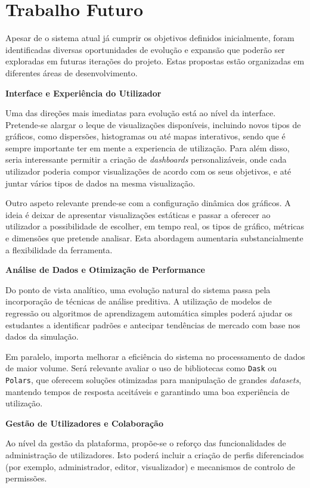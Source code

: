 \section{Trabalho Futuro}

Apesar de o sistema atual já cumprir os objetivos definidos inicialmente, foram identificadas diversas oportunidades de evolução e expansão que poderão ser exploradas em futuras iterações do projeto. Estas propostas estão organizadas em diferentes áreas de desenvolvimento.

\textbf{Interface e Experiência do Utilizador}

Uma das direções mais imediatas para evolução está ao nível da interface. Pretende-se alargar o leque de visualizações disponíveis, incluindo novos tipos de gráficos, como dispersões, histogramas ou até mapas interativos, sendo que é sempre importante ter em mente a experiencia de utilização. Para além disso, seria interessante permitir a criação de \textit{dashboards} personalizáveis, onde cada utilizador poderia compor visualizações de acordo com os seus objetivos, e até juntar vários tipos de dados na mesma visualização.

Outro aspeto relevante prende-se com a configuração dinâmica dos gráficos. A ideia é deixar de apresentar visualizações estáticas e passar a oferecer ao utilizador a possibilidade de escolher, em tempo real, os tipos de gráfico, métricas e dimensões que pretende analisar. Esta abordagem aumentaria substancialmente a flexibilidade da ferramenta.

\textbf{Análise de Dados e Otimização de Performance}

Do ponto de vista analítico, uma evolução natural do sistema passa pela incorporação de técnicas de análise preditiva. A utilização de modelos de regressão ou algoritmos de aprendizagem automática simples poderá ajudar os estudantes a identificar padrões e antecipar tendências de mercado com base nos dados da simulação.

Em paralelo, importa melhorar a eficiência do sistema no processamento de dados de maior volume. Será relevante avaliar o uso de bibliotecas como \texttt{Dask} ou \texttt{Polars}, que oferecem soluções otimizadas para manipulação de grandes \textit{datasets}, mantendo tempos de resposta aceitáveis e garantindo uma boa experiência de utilização.

\textbf{Gestão de Utilizadores e Colaboração}

Ao nível da gestão da plataforma, propõe-se o reforço das funcionalidades de administração de utilizadores. Isto poderá incluir a criação de perfis diferenciados (por exemplo, administrador, editor, visualizador) e mecanismos de controlo de permissões.

